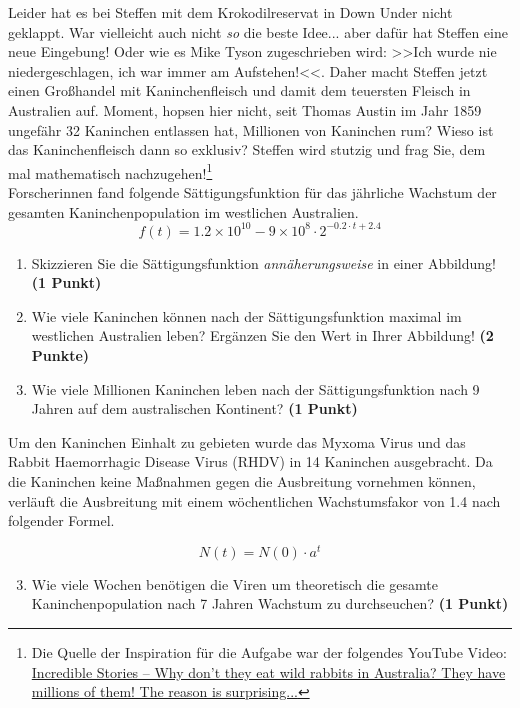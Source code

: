 \documentclass[a4paper, 9pt]{scrartcl}\usepackage[]{graphicx}\usepackage[]{xcolor}
\begin{document}
Leider hat es bei Steffen mit dem Krokodilreservat in Down Under nicht geklappt. War vielleicht auch nicht \textit{so} die beste Idee... aber dafür hat Steffen eine neue Eingebung! Oder wie es Mike Tyson zugeschrieben wird: >>Ich wurde nie niedergeschlagen, ich war immer am Aufstehen!<<. Daher macht Steffen jetzt einen Großhandel mit Kaninchenfleisch und damit dem teuersten Fleisch in Australien auf. Moment, hopsen hier nicht, seit Thomas Austin im Jahr 1859 ungefähr 32 Kaninchen entlassen hat, Millionen von Kaninchen rum? Wieso ist das Kaninchenfleisch dann so exklusiv? Steffen wird stutzig und frag Sie, dem mal mathematisch nachzugehen!\footnote{Die Quelle der Inspiration für die Aufgabe war der folgendes YouTube Video: \href{https://youtu.be/38fuOr3tdgc?si=Li7NL_FoByML8JtT}{ Incredible Stories -- Why don't they eat wild rabbits in Australia? They have    millions of them! The reason is surprising...}} \\

Forscherinnen fand folgende Sättigungsfunktion für das jährliche Wachstum der gesamten Kaninchenpopulation im westlichen Australien.
\begin{equation*}
  f(t) = \ensuremath{1.2\times 10^{10}} - \ensuremath{9\times 10^{8}} \cdot 2^{-0.2 \cdot t + 2.4}
\end{equation*}

\begin{enumerate}
\item Skizzieren Sie die Sättigungsfunktion \textit{annäherungsweise} in einer Abbildung! \textbf{(1 Punkt)}
\item Wie viele Kaninchen können nach der Sättigungsfunktion maximal im westlichen Australien leben? Ergänzen Sie den Wert in Ihrer Abbildung! \textbf{(2 Punkte)}
\item Wie viele Millionen Kaninchen leben nach der Sättigungsfunktion nach 9 Jahren auf dem australischen Kontinent? \textbf{(1 Punkt)}
\end{enumerate}

Um den Kaninchen Einhalt zu gebieten wurde das Myxoma Virus und das Rabbit Haemorrhagic Disease Virus (RHDV) in 14 Kaninchen ausgebracht. Da die Kaninchen keine Maßnahmen gegen die Ausbreitung vornehmen können, verläuft die Ausbreitung mit einem wöchentlichen Wachstumsfakor von 1.4 nach folgender Formel.

\begin{equation*}
  N(t) = N(0) \cdot a^t
\end{equation*}

\begin{enumerate}
  \setcounter{enumi}{2}
\item Wie viele Wochen benötigen die Viren um theoretisch die gesamte Kaninchenpopulation nach 7 Jahren Wachstum zu durchseuchen? \textbf{(1 Punkt)}
\end{enumerate}
\end{document}
